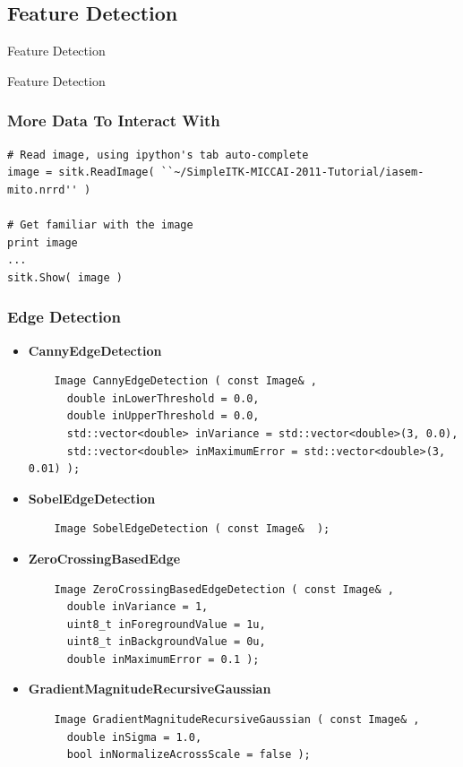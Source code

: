 
\subsection{Feature Detection}

\begin{frame}{Feature Detection}
\fontsize{36pt}{36pt}\selectfont
\center
\begin{center}
Feature Detection
\end{center}
\end{frame}

\begin{frame}[fragile]
\frametitle{More Data To Interact With}
\lstpython
\begin{lstlisting}
# Read image, using ipython's tab auto-complete
image = sitk.ReadImage( ``~/SimpleITK-MICCAI-2011-Tutorial/iasem-mito.nrrd'' )

# Get familiar with the image
print image
...
sitk.Show( image )
\end{lstlisting}
\end{frame}

\begin{frame}[fragile]
\frametitle{Edge Detection} 

\begin{itemize}
  \item {\bf CannyEdgeDetection}
\begin{lstlisting}
    Image CannyEdgeDetection ( const Image& ,
      double inLowerThreshold = 0.0,
      double inUpperThreshold = 0.0,
      std::vector<double> inVariance = std::vector<double>(3, 0.0),
      std::vector<double> inMaximumError = std::vector<double>(3, 0.01) );
\end{lstlisting}
  \item {\bf SobelEdgeDetection }
\begin{lstlisting}
    Image SobelEdgeDetection ( const Image&  );
\end{lstlisting}
  \item {\bf ZeroCrossingBasedEdge }
\begin{lstlisting}
    Image ZeroCrossingBasedEdgeDetection ( const Image& ,
      double inVariance = 1,
      uint8_t inForegroundValue = 1u,
      uint8_t inBackgroundValue = 0u,
      double inMaximumError = 0.1 );
\end{lstlisting}
  \item {\bf GradientMagnitudeRecursiveGaussian }
\begin{lstlisting}
    Image GradientMagnitudeRecursiveGaussian ( const Image& ,
      double inSigma = 1.0,
      bool inNormalizeAcrossScale = false );
\end{lstlisting}
\end{itemize}

\end{frame}



